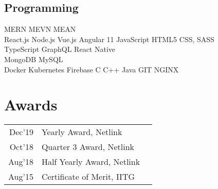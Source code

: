 \documentclass[]{ayush-gupta-resume-openfont}
\begin{document}
\begin{minipage}[t]{0.28\textwidth}
\subsection{Programming}
\vspace{2mm}
MERN \textbullet{} MEVN \textbullet{} MEAN \\
\vspace{2mm}
React.js \textbullet{}   Node.js \textbullet{} Vue.js \textbullet{} Angular 11 \textbullet{} JavaScript \textbullet{} HTML5 \textbullet{} CSS, SASS \\
\vspace{2mm}
TypeScript \textbullet{} GraphQL \textbullet{} React Native \textbullet{} \\
\vspace{2mm}
MongoDB \textbullet{} MySQL \\
\vspace{2mm}
Docker \textbullet{} Kubernetes \textbullet{} Firebase \textbullet{} C \textbullet{} C++ \textbullet{} Java \textbullet{} GIT \textbullet{} NGINX
\sectionsep


\section{Awards} 
\begin{tabular}{rll}
Dec'19  & Yearly Award, Netlink\\
Oct'18  & Quarter 3 Award, Netlink\\
Aug'18  & Half Yearly Award, Netlink\\
Aug'15  & Certificate of Merit, IITG \\
\end{tabular}
\sectionsep

%
%

\end{minipage} 
\hfill
\end{document}

